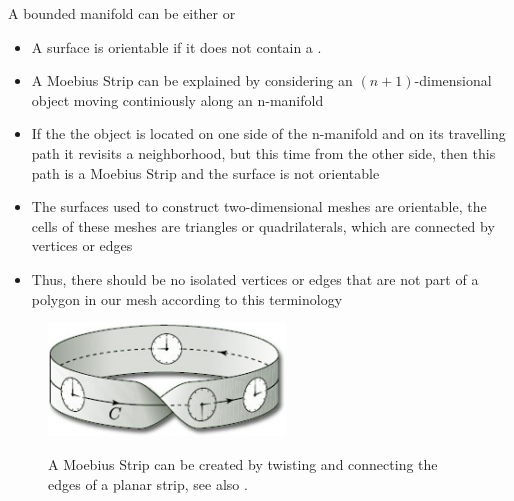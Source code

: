 \begin{frame}
A bounded manifold can be either  or 
\begin{itemize}
\item A surface is orientable if it does not contain a  \cite{Edelsbrunner:2006:GTM:1137760}.
\item A Moebius Strip can be explained by considering an $(n+1)$-dimensional object moving continiously along an n-manifold
\item If the the object is located on one side of the n-manifold and on its travelling path it revisits a neighborhood, but this time from the other side, then this path is a Moebius Strip and the surface is not orientable
\item The surfaces used to construct two-dimensional meshes are orientable, the cells of these meshes are triangles or quadrilaterals, which are connected by vertices or edges
\item Thus, there should be no isolated vertices or edges that are not part of a polygon in our mesh according to this terminology
\end{itemize}

\begin{figure}[h!]
 \includegraphics[height=3cm]{screenshots/moebius.jpg}
 \label{fig:moebius-render}
\caption{A Moebius Strip can be created by twisting and connecting the edges of a planar strip, see also \cite{Edelsbrunner:2006:GTM:1137760,kinsey1993topology}.}
\label{fig:moebius}
\end{figure}
\end{frame}

